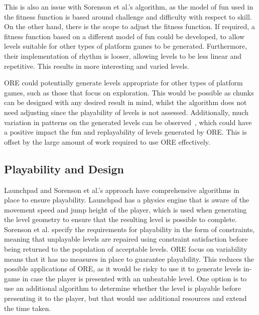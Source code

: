 \documentclass{scrartcl}
\begin{document}
This is also an issue with Sorenson et al.'s algorithm, as the model of fun used in the fitness function is based around challenge and difficulty with respect to skill. On the other hand, there is the scope to adjust the fitness function. If required, a fitness function based on a different model of fun could be developed, to allow levels suitable for other types of platform games to be generated. Furthermore, their implementation of rhythm is looser, allowing levels to be less linear and repetitive. This results in more interesting and varied levels.

ORE could potentially generate levels appropriate for other types of platform games, such as those that focus on exploration. This would be possible as chunks can be designed with any desired result in mind, whilst the algorithm does not need adjusting since the playability of levels is not assessed. Additionally, much variation in patterns on the generated levels can be observed~\cite{horn:comparative}, which could have a positive impact the fun and replayability of levels generated by ORE. This is offset by the large amount of work required to use ORE effectively.


\subsection{Playability and Design}
Launchpad and Sorenson et al.'s approach have comprehensive algorithms in place to ensure playability. Launchpad has a physics engine that is aware of the movement speed and jump height of the player, which is used when generating the level geometry to ensure that the resulting level is possible to complete.
Sorenson et al. specify the requirements for playability in the form of constraints, meaning that unplayable levels are repaired using constraint satisfaction before being returned to the population of acceptable levels. 
ORE focus on variability means that it has no measures in place to guarantee playability. This reduces the possible applications of ORE, as it would be risky to use it to generate levels in-game in case the player is presented with an unbeatable level. One option is to use an additional algorithm to determine whether the level is playable before presenting it to the player, but that would use additional resources and extend the time taken.
\end{document}
